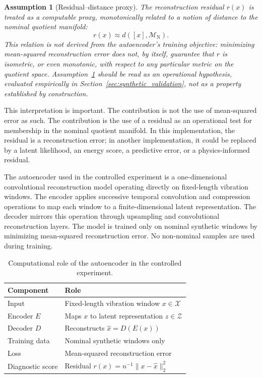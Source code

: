 \documentclass[11pt,letterpaper]{article}
\newtheorem{assumption}{Assumption}
\newcommand{\X}{\ensuremath{\mathcal{X}}}
\newcommand{\Z}{\ensuremath{\mathcal{Z}}}
\newcommand{\Mnominal}{\ensuremath{\mathcal{M}_{\mathrm{N}}}}
\newcommand{\residual}{\ensuremath{r}}
\begin{document}
\begin{assumption}[Residual--distance proxy]
\label{ass:residual_proxy}
The reconstruction residual \(\residual(x)\) is treated as a computable proxy, monotonically related to a notion of distance to the nominal quotient manifold:
\begin{equation}
\residual(x) \approx d([x],\Mnominal).
\label{eq:distance_proxy}
\end{equation}
This relation is not derived from the autoencoder's training objective: minimizing mean-squared reconstruction error does not, by itself, guarantee that \(\residual\) is isometric, or even monotonic, with respect to any particular metric on the quotient space.
Assumption~\ref{ass:residual_proxy} should be read as an operational hypothesis, evaluated empirically in Section~\ref{sec:synthetic_validation}, not as a property established by construction.
\end{assumption}

This interpretation is important.
The contribution is not the use of mean-squared error as such.
The contribution is the use of a residual as an operational test for membership in the nominal quotient manifold.
In this implementation, the residual is a reconstruction error; in another implementation, it could be replaced by a latent likelihood, an energy score, a predictive error, or a physics-informed residual.

The autoencoder used in the controlled experiment is a one-dimensional convolutional reconstruction model operating directly on fixed-length vibration windows.
The encoder applies successive temporal convolution and compression operations to map each window to a finite-dimensional latent representation.
The decoder mirrors this operation through upsampling and convolutional reconstruction layers.
The model is trained only on nominal synthetic windows by minimizing mean-squared reconstruction error.
No non-nominal samples are used during training.

\begin{table}[H]
\centering
\caption{
Computational role of the autoencoder in the controlled experiment.
}
\label{tab:autoencoder_role}
\begin{tabular}{ll}
\toprule
Component & Role \\
\midrule
Input & Fixed-length vibration window \(x \in \X\) \\
Encoder \(E\) & Maps \(x\) to latent representation \(z \in \Z\) \\
Decoder \(D\) & Reconstructs \(\hat{x}=D(E(x))\) \\
Training data & Nominal synthetic windows only \\
Loss & Mean-squared reconstruction error \\
Diagnostic score & Residual \(r(x)=n^{-1}\|x-\hat{x}\|_2^2\) \\
\bottomrule
\end{tabular}
\end{table}
\end{document}
